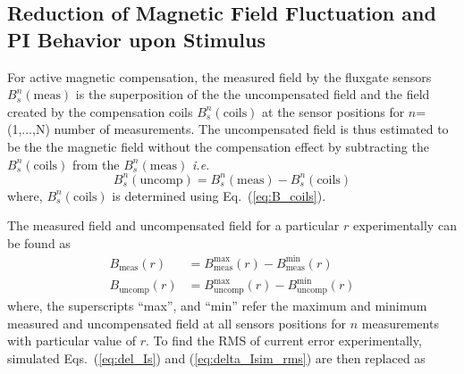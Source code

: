 
\subsection{Reduction of Magnetic Field Fluctuation and PI Behavior upon Stimulus}


For active magnetic compensation, the measured field by the fluxgate sensors $B_s^n(\text{meas})$ is the superposition of the the uncompensated field and the field created by the compensation coils $B_s^n(\text{coils})$ at the sensor positions for $n$=(1,...,N) number of measurements. The uncompensated field is thus estimated to be the the magnetic field without the compensation effect by subtracting the $B_s^n(\text{coils})$ from the $B_s^n(\text{meas})$ {\it i.e.}
\begin{equation}\label{eq:Buncomp}
     B_s^n(\text{uncomp})=B_s^n(\text{meas})- B_s^n(\text{coils})
\end{equation}
where, $B_s^n(\text{coils})$ is determined using Eq.~(\ref{eq:B_coils}).


The measured field and uncompensated field for a particular $r$ experimentally can be found as
\begin{align}
    B_{\text{meas}}(r) &= 
    B_{\text{meas}}^{\text{max}}(r)-B_{\text{meas}}^{\text{min}}(r)\label{eq:bmeas_r}\\
    B_{\text{uncomp}}(r) &= B_{\text{uncomp}}^{\text{max}}(r)-B_{\text{uncomp}}^{\text{min}}(r)\label{eq:buncomp_r}
\end{align}
where, the superscripts ``max'', and ``min'' refer the maximum and minimum measured and uncompensated field at all sensors positions for $n$ measurements with particular value of $r$. To find the RMS of current error experimentally, simulated Eqs.~(\ref{eq:del_Is}) and (\ref{eq:delta_Isim_rms}) are then replaced as

